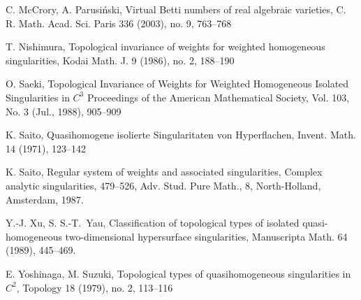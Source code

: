 \documentclass[12pt,a4paper,leqno]{amsart}
\theoremstyle{definition}
\begin{document}
\begin{thebibliography}{99}
 C. McCrory, A. Parusi\'nski,
Virtual Betti numbers of real algebraic varieties,  
C. R. Math. Acad. Sci. Paris  336  (2003),  no. 9, 763--768

 T. Nishimura,
Topological invariance of weights for weighted homogeneous
singularities, 
Kodai Math. J.  9  (1986),  no. 2, 188--190

 O. Saeki,
Topological Invariance of Weights for Weighted Homogeneous Isolated Singularities in $C^3$ 
Proceedings of the American Mathematical Society, Vol. 103, No. 3 (Jul., 1988), 905--909 

 K. Saito, 
Quasihomogene isolierte Singularitaten von Hyperflachen,
Invent. Math.  14  (1971), 123--142

K. Saito,
Regular system of weights and associated singularities,
Complex analytic singularities,
479--526, Adv. Stud. Pure Math., 8, North-Holland, Amsterdam, 1987.

Y.-J. Xu, S. S.-T.~Yau, 
Classification of topological types of isolated quasi-homogeneous 
two-dimensional hypersurface singularities, 
Manuscripta Math. 64 (1989), 445--469. 

 E. Yoshinaga, M. Suzuki,
Topological types of quasihomogeneous singularities in $C^{2}$,
Topology  18  (1979), no. 2, 113--116

\end{thebibliography}
\end{document}
